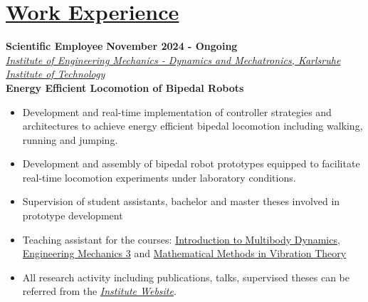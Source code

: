 
\section{\underline{Work Experience}}

\large{\textbf{Scientific Employee}}
\hfill
\large{\textbf{November 2024 - Ongoing}}\\
\href{https://www.itm.kit.edu/dynamik/index.php}{\large{\emph{Institute of Engineering Mechanics - Dynamics and Mechatronics, Karlsruhe Institute of Technology}}}\\
\large{\textbf{Energy Efficient Locomotion of Bipedal Robots}}
\begin{itemize}
	\item Development and real-time implementation of controller strategies and architectures to achieve energy efficient bipedal locomotion including walking, running and jumping.
	\item Development and assembly of bipedal robot prototypes equipped to facilitate real-time locomotion experiments under laboratory conditions.
	\item Supervision of student assistants, bachelor and master theses involved in prototype development
	\item Teaching assistant for the courses: \href{https://www.itm.kit.edu/dynamik/Lehre_2497.php}{Introduction to Multibody Dynamics}, \href{https://www.itm.kit.edu/dynamik/4358_2753.php}{Engineering Mechanics 3} and \href{https://www.itm.kit.edu/dynamik/Lehre_MM_Schwingungslehre_Uebung.php}{Mathematical Methods in Vibration Theory}
	\item All research activity including publications, talks, supervised theses can be referred from the \href{https://www.itm.kit.edu/dynamik/Mitarbeiter_Mukherjee.php}{\emph{Institute Website}}.
\end{itemize}

